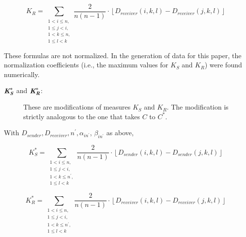 \documentclass{article}
\def\mathbi#1{\textbf{\em #1}} %
\begin{document}
\[K_{R} = \sum\limits_{\substack{1 < i \leq n, \\ 1 \leq j < i, \\ 1 < k \leq n, \\ 1 \leq l < k}} \frac{2}{n(n-1)}\cdot\left\lfloor D_{receiver}(i, k, l) - D_{receiver}(j,k,l)\right\rfloor\]

These formulas are not normalized. In the generation of data for this paper, the normalization coefficients (i.e., the maximum values for $K_S$ and $K_R$) were found numerically.

\begin{description}
    \item[$\mathbi{K}^*_\mathbi{S}$ and $\mathbi{K}^*_\mathbi{R}$:]
These are modifications of measures $K_S$ and $K_R$. The modification is strictly analogous to the one that takes $C$ to $C^*$.

\end{description}

With $D_{sender}, D_{receiver}, n^\prime, \alpha_{in^\prime}$, $\beta_{in^\prime}$ as above,

\[K^{*}_{S} = \sum\limits_{\substack{1 < i \leq n, \\ 1 \leq j < i, \\ 1 < k \leq n^\prime, \\ 1 \leq l < k}} \frac{2}{n(n-1)}\cdot\left\lfloor D_{sender}(i, k, l) - D_{sender}(j,k,l)\right\rfloor\]

\[K^{*}_{R} = \sum\limits_{\substack{1 < i \leq n, \\ 1 \leq j < i, \\ 1 < k \leq n^\prime, \\ 1 \leq l < k}} \frac{2}{n(n-1)}\cdot\left\lfloor D_{receiver}(i, k, l) - D_{receiver}(j,k,l)\right\rfloor\]
\end{document}
